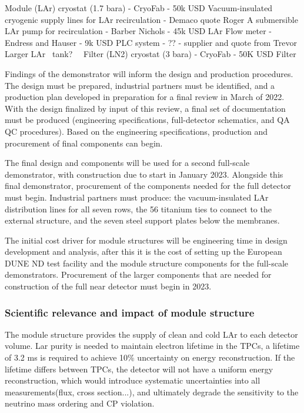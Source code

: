 Module (LAr) cryostat (1.7 bara) - CryoFab - 50k USD
Vacuum-insulated cryogenic supply lines for LAr recirculation - Demaco quote Roger
A submersible LAr pump for recirculation - Barber Nichols - 45k USD
LAr Flow meter - Endress and Hauser - 9k USD
PLC system - ?? - supplier and quote from Trevor
Larger LAr  tank?  
Filter (LN2) cryostat (3 bara) - CryoFab - 50K USD
Filter

Findings of the demonstrator will inform the design and production procedures. The design must be prepared, industrial partners must be identified, and a production plan developed in preparation for a final review in March of 2022. With the design finalized by input of this review, a final set of documentation must be produced (engineering specifications, full-detector schematics, and QA QC procedures). Based on the engineering specifications, production and procurement of final components can begin.

The final design and components will be used for a second full-scale demonstrator, with construction due to start in January 2023. Alongside this final demonstrator, procurement of the components needed for the full detector must begin. Industrial partners must produce: the vacuum-insulated LAr distribution lines for all seven rows, the 56 titanium ties to connect to the external structure, and the seven steel support plates below the membranes.

The initial cost driver for module structures will be engineering time in design development and analysis, after this it is the cost of setting up the European DUNE ND test facility and the module structure components for the full-scale demonstrators. Procurement of the larger components that are needed for construction of the full near detector must begin in 2023.

\subsubsection{Scientific relevance and impact of module structure}
The module structure provides the supply of clean and cold LAr to each detector volume. Lar purity is needed to maintain electron lifetime in the TPCs, a lifetime of 3.2 ms is required to achieve 10\% uncertainty on energy reconstruction. If the lifetime differs between TPCs, the detector will not have a uniform energy reconstruction, which would introduce systematic uncertainties into all measurements(flux, cross section...), and ultimately degrade the sensitivity to the neutrino mass ordering and CP violation.

